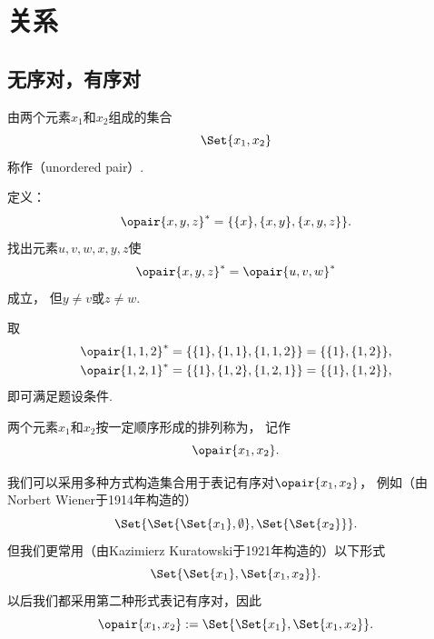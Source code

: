 \section{关系}
\subsection{无序对，有序对}
\begin{definition}
由两个元素\(x_1\)和\(x_2\)组成的集合\begin{equation*}
\Set{x_1, x_2}
\end{equation*}称作（unordered pair）.
\end{definition}

\begin{example}
定义：\begin{equation*}
	\opair{x,y,z}^* = \{\{x\},\{x,y\},\{x,y,z\}\}.
\end{equation*}
找出元素\(u,v,w,x,y,z\)使\begin{equation*}
	\opair{x,y,z}^* = \opair{u,v,w}^*
\end{equation*}成立，
但\(y \neq v\)或\(z \neq w\).
\begin{solution}
取\begin{gather*}
	\opair{1,1,2}^* = \{\{1\},\{1,1\},\{1,1,2\}\} = \{\{1\},\{1,2\}\}, \\
	\opair{1,2,1}^* = \{\{1\},\{1,2\},\{1,2,1\}\} = \{\{1\},\{1,2\}\},
\end{gather*}
即可满足题设条件.
\end{solution}
\end{example}

\begin{definition}
两个元素\(x_1\)和\(x_2\)按一定顺序形成的排列称为，
记作\begin{equation*}
	\opair{x_1,x_2}.
\end{equation*}

我们可以采用多种方式构造集合用于表记有序对\(\opair{x_1,x_2}\)，
例如（由Norbert Wiener于1914年构造的）
\begin{equation*}
	\Set{ \Set{ \Set{x_1}, \emptyset }, \Set{ \Set{ x_2 } } }.
\end{equation*}
但我们更常用（由Kazimierz Kuratowski于1921年构造的）以下形式
\begin{equation*}
	\Set{ \Set{x_1}, \Set{x_1, x_2} }.
\end{equation*}
以后我们都采用第二种形式表记有序对，因此\begin{equation*}
	\opair{x_1,x_2}
	\defeq
	\Set{ \Set{x_1}, \Set{x_1, x_2} }.
\end{equation*}
\end{definition}

